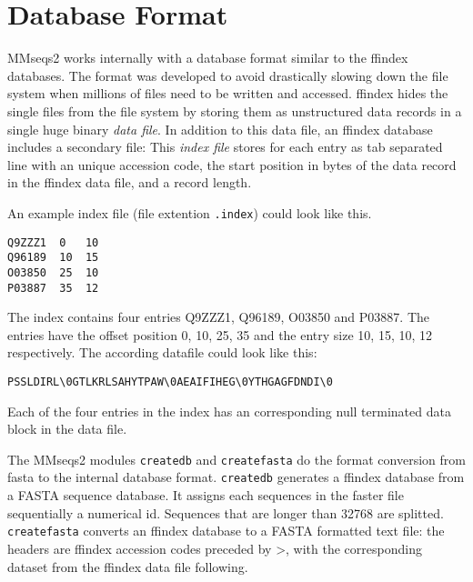 \documentclass[11pt,a4paper]{scrreprt}
\begin{document}
\section{Database Format}
MMseqs2 works internally with a database format similar to the ffindex databases. The format was developed to avoid drastically slowing down the file system when millions of files need to be written and accessed. ffindex hides the single files from the file system by storing them as unstructured data records in a single huge binary \emph{data file}. In addition to this data file, an ffindex database includes a secondary file: This \emph{index file} stores for each entry as tab separated line with an unique accession code, the start position in bytes of the data record in the ffindex data file, and a record length.

An example index file (file extention \texttt{.index}) could look like this.

\begin{verbatim}
Q9ZZZ1	0	10
Q96189	10	15	
O03850	25	10
P03887	35	12
\end{verbatim}

The index contains four entries Q9ZZZ1, Q96189, O03850 and P03887. The entries have the offset position 0, 10, 25, 35 and the entry size 10, 15, 10, 12 respectively. 
The according datafile could look like this:
\begin{verbatim}
PSSLDIRL\0GTLKRLSAHYTPAW\0AEAIFIHEG\0YTHGAGFDNDI\0
\end{verbatim}
Each of the four entries in the index has an corresponding null terminated data block in the data file. 



The MMseqs2 modules \texttt{createdb} and \texttt{createfasta} do the format conversion from fasta to the internal database format. 
\texttt{createdb} generates a ffindex database from a FASTA sequence database. It assigns each sequences in the faster file sequentially a numerical id. Sequences that are longer than 32768 are splitted. 
\texttt{createfasta} converts an ffindex database to a FASTA formatted text file: the headers are ffindex accession codes preceded by \textgreater, with the corresponding dataset from the ffindex data file following.
\end{document}
